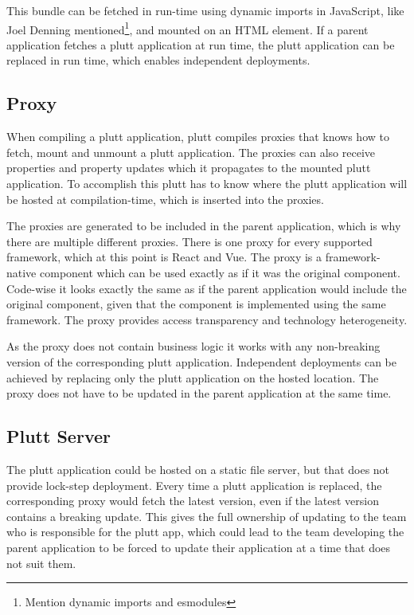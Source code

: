 This bundle can be fetched in run-time using dynamic imports in JavaScript, like Joel Denning mentioned\footnote{Mention dynamic imports and esmodules}, and mounted on an HTML element. If a parent application fetches a plutt application at run time, the plutt application can be replaced in run time, which enables independent deployments.


\subsection{Proxy}
When compiling a plutt application, plutt compiles proxies that knows how to fetch, mount and unmount a plutt application. The proxies can also receive properties and property updates which it propagates to the mounted plutt application. To accomplish this plutt has to know where the plutt application will be hosted at compilation-time, which is inserted into the proxies.

The proxies are generated to be included in the parent application, which is why there are multiple different proxies. There is one proxy for every supported framework, which at this point is React and Vue. The proxy is a framework-native component which can be used exactly as if it was the original component. Code-wise it looks exactly the same as if the parent application would include the original component, given that the component is implemented using the same framework. The proxy provides access transparency and technology heterogeneity.

As the proxy does not contain business logic it works with any non-breaking version of the corresponding plutt application. Independent deployments can be achieved by replacing only the plutt application on the hosted location. The proxy does not have to be updated in the parent application at the same time.

\subsection{Plutt Server}
The plutt application could be hosted on a static file server, but that does not provide lock-step deployment. Every time a plutt application is replaced, the corresponding proxy would fetch the latest version, even if the latest version contains a breaking update. This gives the full ownership of updating to the team who is responsible for the plutt app, which could lead to the team developing the parent application to be forced to update their application at a time that does not suit them.

